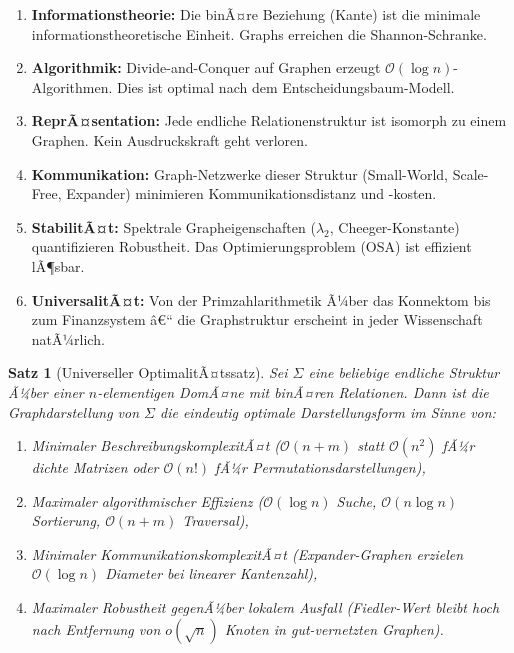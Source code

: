 ﻿\documentclass[12pt,a4paper,twoside]{article}
\theoremstyle{definition}
\theoremstyle{plain}
\newtheorem{theorem}{Satz}[section]
\theoremstyle{remark}
\begin{document}
\begin{enumerate}[label=\textbf{P\arabic*.}]
  \item \textbf{Informationstheorie:} Die binÃ¤re Beziehung
        (Kante) ist die minimale informationstheoretische Einheit.
        Graphs erreichen die Shannon-Schranke.
  \item \textbf{Algorithmik:} Divide-and-Conquer auf Graphen
        erzeugt $\mathcal{O}(\log n)$-Algorithmen.  Dies ist
        optimal nach dem Entscheidungsbaum-Modell.
  \item \textbf{ReprÃ¤sentation:} Jede endliche Relationenstruktur
        ist isomorph zu einem Graphen.  Kein Ausdruckskraft geht
        verloren.
  \item \textbf{Kommunikation:} Graph-Netzwerke dieser Struktur
        (Small-World, Scale-Free, Expander) minimieren
        Kommunikationsdistanz und -kosten.
  \item \textbf{StabilitÃ¤t:} Spektrale Grapheigenschaften
        ($\lambda_2$, Cheeger-Konstante) quantifizieren Robustheit.
        Das Optimierungsproblem (OSA) ist effizient lÃ¶sbar.
  \item \textbf{UniversalitÃ¤t:} Von der Primzahlarithmetik
        Ã¼ber das Konnektom bis zum Finanzsystem â€“ die
        Graphstruktur erscheint in jeder Wissenschaft natÃ¼rlich.
\end{enumerate}

\begin{theorem}[Universeller OptimalitÃ¤tssatz]
\label{thm:haupt}
Sei $\Sigma$ eine beliebige endliche Struktur Ã¼ber einer
$n$-elementigen DomÃ¤ne mit binÃ¤ren Relationen.  Dann ist
die Graphdarstellung von $\Sigma$ die eindeutig optimale
Darstellungsform im Sinne von:
\begin{enumerate}[label=(\roman*)]
  \item Minimaler BeschreibungskomplexitÃ¤t
        ($\mathcal{O}(n + m)$ statt $\mathcal{O}(n^2)$
         fÃ¼r dichte Matrizen oder $\mathcal{O}(n!)$ fÃ¼r
         Permutationsdarstellungen),
  \item Maximaler algorithmischer Effizienz
        ($\mathcal{O}(\log n)$ Suche, $\mathcal{O}(n \log n)$
         Sortierung, $\mathcal{O}(n + m)$ Traversal),
  \item Minimaler KommunikationskomplexitÃ¤t
        (Expander-Graphen erzielen $\mathcal{O}(\log n)$
         Diameter bei linearer Kantenzahl),
  \item Maximaler Robustheit gegenÃ¼ber lokalem Ausfall
        (Fiedler-Wert bleibt hoch nach Entfernung von $o(\sqrt{n})$
         Knoten in gut-vernetzten Graphen).
\end{enumerate}
\end{theorem}
\end{document}
